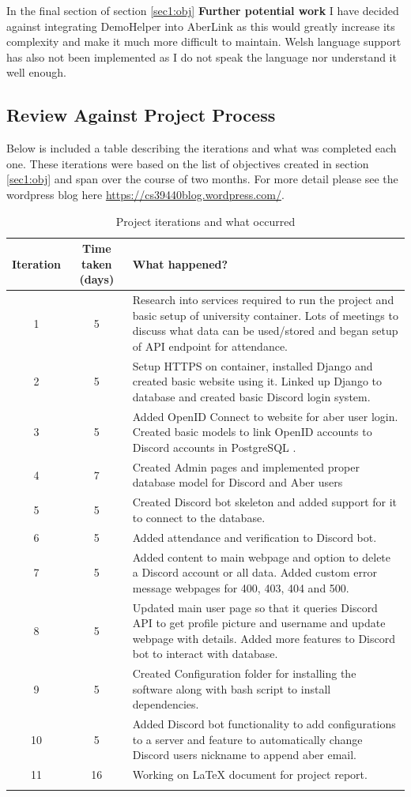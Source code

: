 In the final section of section \ref{sec1:obj} \textbf{Further potential work} I have decided against integrating DemoHelper into AberLink as this would greatly increase its complexity and make it much more difficult to maintain. Welsh language support has also not been implemented as I do not speak the language nor understand it well enough.

\subsection{Review Against Project Process}\label{sec3:pp}

Below is included a table describing the iterations and what was completed each one. These iterations were based on the list of objectives created in section \ref{sec1:obj} and span over the course of two months. For more detail please see the wordpress blog here \href{https://cs39440blog.wordpress.com/}{https://cs39440blog.wordpress.com/}.
\newpage
\begin{longtable}[H]{| c | c | p{9cm} |}
\hline
Iteration & Time taken (days) & What happened? \\
\hline
1 & 5 & Research into services required to run the project and basic setup of university container. Lots of meetings to discuss what data can be used/stored and began setup of API endpoint for attendance. \\
\hline
2 & 5 & Setup HTTPS on container, installed Django \cite{Django} and created basic website using it. Linked up Django to database and created basic Discord login system. \\
\hline
3 & 5 & Added OpenID Connect \cite{OpenID} to website for aber user login. Created basic models to link OpenID accounts to Discord accounts in PostgreSQL \cite{psql}. \\
\hline
4 & 7 & Created Admin pages and implemented proper database model for Discord and Aber users\\
\hline
5 & 5 & Created Discord bot skeleton and added support for it to connect to the database.\\
\hline
6 & 5 & Added attendance and verification to Discord bot. \\
\hline
7 & 5 & Added content to main webpage and option to delete a Discord account or all data. Added custom error message webpages for 400, 403, 404 and 500. \\
\hline
8 & 5 & Updated main user page so that it queries Discord API to get profile picture and username and update webpage with details. Added more features to Discord bot to interact with database.\\
\hline
9 & 5 & Created Configuration folder for installing the software along with bash script to install dependencies.\\
\hline
10 & 5 & Added Discord bot functionality to add configurations to a server and feature to automatically change Discord users nickname to append aber email.\\
\hline
11 & 16 & Working on LaTeX document for project report. \\
\hline
\caption{Project iterations and what occurred}
\label{tab:project-iterations}
\end{longtable}

